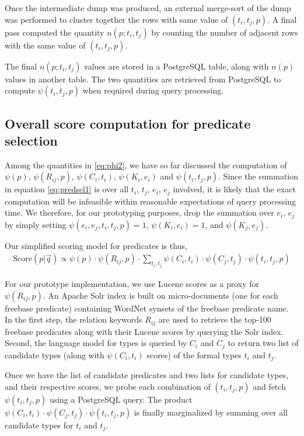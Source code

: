 \documentclass[a4paper, twoside, 12pt]{report}
\begin{document}
Once the intermediate dump was produced, an external merge-sort of the dump was performed to cluster together the rows with same value of $(t_i,t_j,p)$. A final pass computed the quantity $n(p;t_i,t_j)$ by counting the number of adjacent rows with the same value of $(t_i, t_j,p)$.

The final $n(p;t_i,t_j)$ values are stored in a PostgreSQL table, along with $n(p)$ values in another table. The two quantities are retrieved from PostgreSQL to compute $\psi(t_i,t_j,p)$ when required during query processing.

\subsection{Overall score computation for predicate selection}
Among the quantities in \ref{eq:phi2}, we have so far discussed the computation of $\psi(p)$, $\psi(R_{ij},p)$, $\psi(C_i,t_i)$, $\psi(K_i,e_i)$ and $\psi(t_i,t_j,p)$. Since the summation in equation \ref{eq:predsel1} is over all $t_i$, $t_j$, $e_i$, $e_j$ involved, it is likely that the exact computation will be infeasible within reasonable expectations of query processing time. We therefore, for our prototyping purposes, drop the summation over $e_i$, $e_j$ by simply setting $\psi(e_i,e_j,t_i,	t_j,p) = 1$, $\psi(K_i,e_i) = 1$, and $\psi(K_j,e_j)$.

Our simplified scoring model for predicates is thus,
\begin{align}
\text{Score}(p|\vec{q}) \propto \psi(p) \cdot \psi(R_{ij},p) \cdot \sum_{t_i,t_j} \psi(C_i,t_i) \cdot \psi(C_j,t_j) \cdot \psi(t_i,t_j,p) \label{eq:predselfinal}
\end{align}

For our prototype implementation, we use Lucene scores as a proxy for $\psi(R_{ij}, p)$. An Apache Solr index is built on micro-documents (one for each freebase predicate) containing WordNet synsets of the freebase predicate name. In the first step, the relation keywords $R_{ij}$ are used to retrieve the top-100 freebase predicates along with their Lucene scores by querying the Solr index. Second, the language model for types is queried by $C_i$ and $C_j$ to return two list of candidate types (along with $\psi(C_i,t_i)$ scores) of the formal types $t_i$ and $t_j$.

Once we have the list of candidate predicates and two lists for candidate types, and their respective scores, we probe each combination of $(t_i,t_j,p)$
 and fetch $\psi(t_i,t_j,p)$ using a PostgreSQL query. The product $\psi(C_i,t_i) \cdot \psi(C_j,t_j) \cdot \psi(t_i,t_j,p)$ is finally marginalized by summing over all candidate types for $t_i$ and $t_j$.
\end{document}
